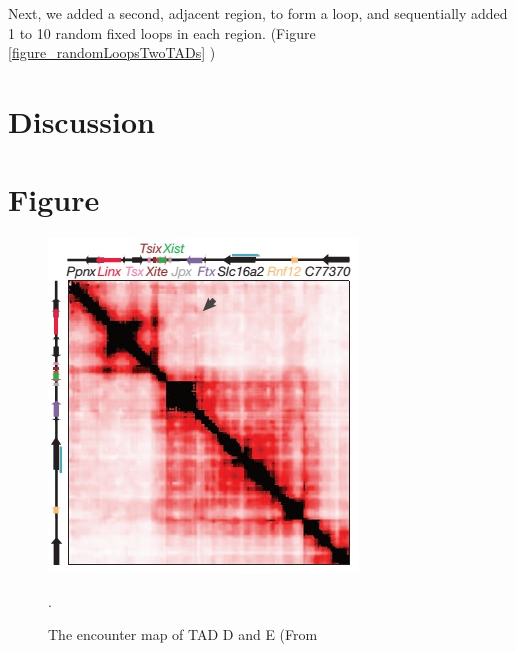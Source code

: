 \documentclass[12pt]{paper}
\begin{document}
Next, we added a second, adjacent region, to form a loop, and sequentially added 1 to 10 random fixed loops in each region. (Figure \ref{figure_randomLoopsTwoTADs} )





\section{Discussion}\label{section_discussion}

\section{Figure}\label{section_figures}

\begin{figure}[H]
\includegraphics[scale=0.8]{TadDandENoraEtAl2012}
\caption{The encounter map of TAD D and E (From \cite{Nora2012}}.
\label{figure_TADDAndENoraEtAl2012}
\end{figure}
\end{document}

